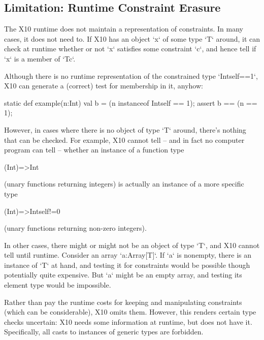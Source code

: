 \subsection{Limitation: Runtime Constraint Erasure}
\label{sect:RuntimeConstraintErasure}

The X10 runtime does not maintain a representation of constraints.
In many cases, it does not need to.
If X10 has an object \xcd`x` of some type \xcd`T` around, it can check at
runtime whether or not \xcd`x` satisfies some constraint \xcd`c`, and hence
tell if \xcd`x` is a member of \xcd`T{c}`. 

\begin{ex}
Although there is no runtime representation of the constrained type 
\xcd`Int{self==1}`, X10 can generate a (correct) test for membership in it,
anyhow: 
\begin{xten}
static def example(n:Int) {
  val b = (n instanceof Int{self == 1});
  assert b == (n == 1); 
}
\end{xten}
\end{ex}

However, in cases where there is no object of type \xcd`T` around, there's
nothing that can be checked. For example, X10 cannot tell -- and in fact no
computer program can tell --  whether an
instance of a function type 
\begin{xtenmath}
(Int)=>Int
\end{xtenmath}
(unary functions returning
integers) is actually an instance of a more specific type
\begin{xtenmath}
(Int)=>Int{self!=0}
\end{xtenmath}
(unary functions returning non-zero integers).

In other cases, there might or might not be an object of type \xcd`T`, and X10
cannot tell until runtime.  Consider an array \xcd`a:Array[T]`.  If \xcd`a` is
nonempty, there is an instance of \xcd`T` at hand, and testing it for
constraints would be possible though potentially quite expensive. 
But \xcd`a` might be an
empty array, and testing its element type would be impossible. 

Rather than pay the runtime costs for keeping and manipulating constraints
(which can be considerable), X10 omits them.
However, this renders certain type checks uncertain: X10 needs some
information at runtime, but does not have it.  
Specifically, all casts to instances of generic types are forbidden.  

